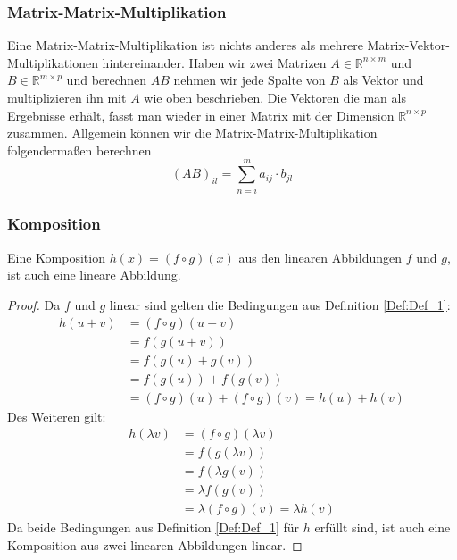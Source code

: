 \subsubsection{Matrix-Matrix-Multiplikation}
Eine Matrix-Matrix-Multiplikation ist nichts anderes als mehrere Matrix-Vektor-Multiplikationen hintereinander. Haben wir zwei Matrizen $A \in \mathbb{R}^{n \times m}$ und $B \in \mathbb{R}^{m \times p}$ und berechnen $AB$ nehmen wir jede Spalte von $B$ als Vektor und multiplizieren ihn mit $A$ wie oben beschrieben. Die Vektoren die man als Ergebnisse erhält, fasst man wieder in einer Matrix mit der Dimension $\mathbb{R}^{n \times p}$ zusammen. Allgemein können wir die Matrix-Matrix-Multiplikation folgendermaßen berechnen
\begin{equation*}
	(AB)_{il} = \sum_{n=i}^{m}a_{ij} \cdot b_{jl}
\end{equation*}

\subsubsection{Komposition}
\begin{Thm}
Eine Komposition $h(x) = (f \circ g)(x)$ aus den linearen Abbildungen $f$ und $g$, ist auch eine lineare Abbildung.
\end{Thm}

\begin{proof}
Da $f$ und $g$ linear sind gelten die Bedingungen aus Definition \ref{Def:Def_1}:
\begin{align*}
	h(u+v) &= (f \circ g)(u+v)\\
	&= f(g(u+v))\\
	&= f(g(u)+g(v))\\
	&= f(g(u)) + f(g(v))\\
	&= (f\circ g)(u) + (f\circ g)(v) = h(u) + h(v)
\end{align*}
Des Weiteren gilt:
\begin{align*}
	h(\lambda v) &= (f \circ g)(\lambda v)\\
	&=f(g(\lambda v))\\
	&= f(\lambda g(v))\\
	&=\lambda f(g(v))\\
	&=\lambda (f \circ g)(v) = \lambda h(v)
\end{align*}
Da beide Bedingungen aus Definition \ref{Def:Def_1} für $h$ erfüllt sind, ist auch eine Komposition aus zwei linearen Abbildungen linear.
\end{proof}

